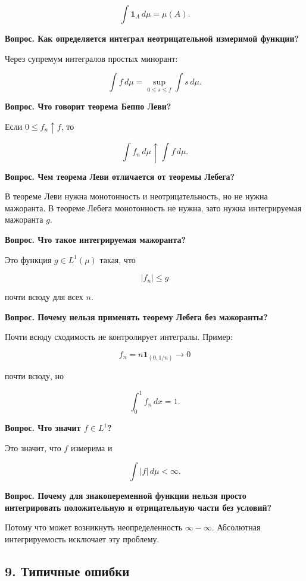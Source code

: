 \documentclass[
  11pt,
  a4paper,
]{article}
\begin{document}
\[
\int\mathbf 1_A\,d\mu=\mu(A).
\]

\textbf{Вопрос. Как определяется интеграл неотрицательной измеримой
функции?}

Через супремум интегралов простых минорант:

\[
\int f\,d\mu=\sup_{0\le s\le f}\int s\,d\mu.
\]

\textbf{Вопрос. Что говорит теорема Беппо Леви?}

Если \(0\le f_n\uparrow f\), то

\[
\int f_n\,d\mu\uparrow\int f\,d\mu.
\]

\textbf{Вопрос. Чем теорема Леви отличается от теоремы Лебега?}

В теореме Леви нужна монотонность и неотрицательность, но не нужна
мажоранта. В теореме Лебега монотонность не нужна, зато нужна
интегрируемая мажоранта \(g\).

\textbf{Вопрос. Что такое интегрируемая мажоранта?}

Это функция \(g\in L^1(\mu)\) такая, что

\[
|f_n|\le g
\]

почти всюду для всех \(n\).

\textbf{Вопрос. Почему нельзя применять теорему Лебега без мажоранты?}

Почти всюду сходимость не контролирует интегралы. Пример:

\[
f_n=n\mathbf 1_{(0,1/n)}\to0
\]

почти всюду, но

\[
\int_0^1 f_n\,dx=1.
\]

\textbf{Вопрос. Что значит \(f\in L^1\)?}

Это значит, что \(f\) измерима и

\[
\int |f|\,d\mu<\infty.
\]

\textbf{Вопрос. Почему для знакопеременной функции нельзя просто
интегрировать положительную и отрицательную части без условий?}

Потому что может возникнуть неопределенность \(\infty-\infty\).
Абсолютная интегрируемость исключает эту проблему.

\subsection{9. Типичные
ошибки}\label{ux442ux438ux43fux438ux447ux43dux44bux435-ux43eux448ux438ux431ux43aux438}
\end{document}
